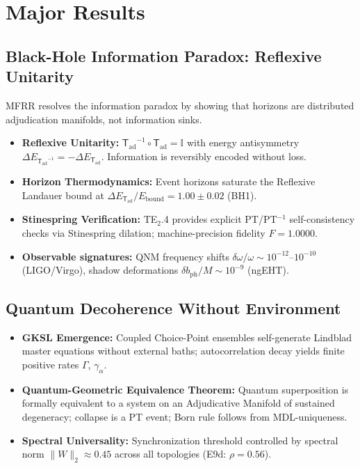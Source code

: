 \documentclass[11pt]{article}
\newcommand{\Trans}{\ensuremath{{\mathsf{T}_{\mathrm{ad}}}}}
\begin{document}
\section{Major Results}

\subsection{Black-Hole Information Paradox: Reflexive Unitarity}

MFRR resolves the information paradox by showing that horizons are distributed adjudication manifolds, not information sinks.

\begin{itemize}[leftmargin=1.5em]
\item \textbf{Reflexive Unitarity:} $\Trans^{-1}\circ\Trans=\mathbb{I}$ with energy antisymmetry $\Delta E_{\Trans^{-1}}=-\Delta E_\Trans$. Information is reversibly encoded without loss.
\item \textbf{Horizon Thermodynamics:} Event horizons saturate the Reflexive Landauer bound at $\Delta E_\Trans/E_\mathrm{bound}=1.00\pm0.02$ (BH1).
\item \textbf{Stinespring Verification:} TE$_2$.4 provides explicit PT/PT$^{-1}$ self-consistency checks via Stinespring dilation; machine-precision fidelity $F=1.0000$.
\item \textbf{Observable signatures:} QNM frequency shifts $\delta\omega/\omega\sim10^{-12}$--$10^{-10}$ (LIGO/Virgo), shadow deformations $\delta b_\mathrm{ph}/M\sim10^{-9}$ (ngEHT).
\end{itemize}

\subsection{Quantum Decoherence Without Environment}

\begin{itemize}[leftmargin=1.5em]
\item \textbf{GKSL Emergence:} Coupled Choice-Point ensembles self-generate Lindblad master equations without external baths; autocorrelation decay yields finite positive rates $\Gamma$, $\gamma_\alpha$.
\item \textbf{Quantum-Geometric Equivalence Theorem:} Quantum superposition is formally equivalent to a system on an Adjudicative Manifold of sustained degeneracy; collapse is a PT event; Born rule follows from MDL-uniqueness.
\item \textbf{Spectral Universality:} Synchronization threshold controlled by spectral norm $\|W\|_2\approx0.45$ across all topologies (E9d: $\rho=0.56$).
\end{itemize}
\end{document}
